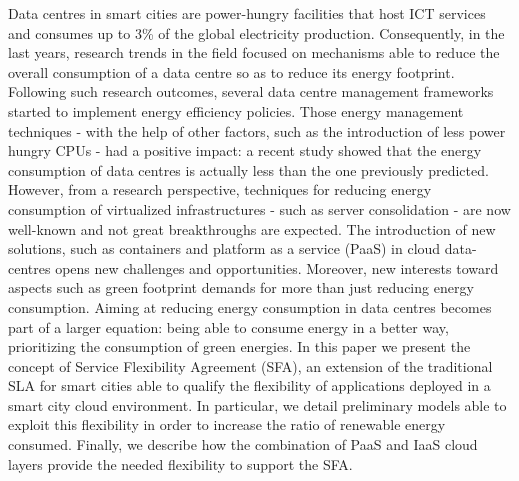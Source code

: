 Data centres in smart cities are power-hungry facilities that host ICT services and consumes up to 3\% of the global electricity production.
Consequently, in the last years, research trends in the field focused on mechanisms able to reduce the overall consumption of a data centre so as to reduce its energy footprint.
Following such research outcomes, several data centre management frameworks started to implement energy efficiency policies.
Those energy management techniques - with the help of other factors, such as the introduction of less power hungry CPUs - had a positive impact: a recent study showed that the energy consumption of data centres is actually less than the one previously predicted.
However, from a research perspective, techniques for reducing energy consumption of virtualized infrastructures - such as server consolidation - are now well-known and not great breakthroughs are expected.
The introduction of new solutions, such as containers and platform as a service (PaaS) in cloud data-centres opens new challenges and opportunities.
Moreover, new interests toward aspects such as green footprint demands for more than just reducing energy consumption. 
Aiming at reducing energy consumption in data centres becomes part of a larger equation: being able to consume energy in a better way, prioritizing the consumption of green energies.
In this paper we present the concept of Service Flexibility Agreement (SFA), an extension of the traditional SLA for smart cities able to qualify the flexibility of applications deployed in a smart city cloud environment.
In particular, we detail preliminary models able to exploit this flexibility in order to increase the ratio of renewable energy consumed.
Finally, we describe how the combination of PaaS and IaaS cloud layers provide the needed flexibility to support the SFA.
